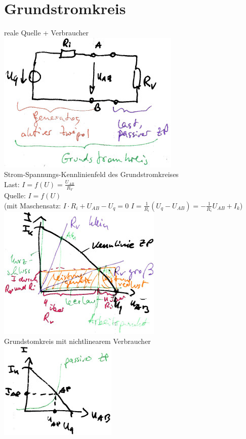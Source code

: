 \section{Grundstromkreis}
reale Quelle + Verbraucher\\
\includegraphics[scale=.75]{Abbildungen/ABB310}\\
Strom-Spannungs-Kennlinienfeld des Grundstromkreises\\
Last: $I=f(U)=\frac{U_{AB}}{R_V}$\\
Quelle: $I=f(U)$ \\
(mit Maschensatz: $I\cdot R_i + U_{AB}-U_q=0$ \qquad $I=\frac{1}{R_i}(U_q-U_{AB})=-\frac{1}{R_i}U_{AB}+I_k$)\\
\includegraphics[scale=.75]{Abbildungen/ABB311}\\
Grundstomkreis mit nichtlinearem Verbraucher\\
\includegraphics[scale=.75]{Abbildungen/ABB312}\\
